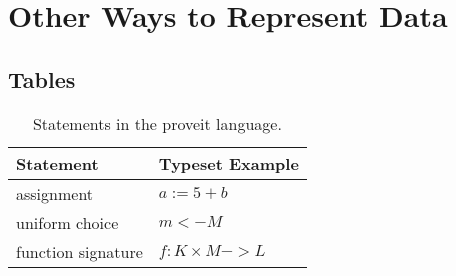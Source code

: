 \documentclass[12pt]{article}
\newcommand\peatykk[1]{
  \clearpage
  \section{#1}}
\begin{document}
\begin{comment}
\begin{figure} [htbp]
\begin{tabular}{c c}
%
\begin{minipage}{0.45\textwidth}
\texttt{[image: LCA\_2\_solutions]}
\end{minipage}
%
&
\begin{minipage}{0.55\textwidth}
\centering
\begin{tabular}{ l | l |}
  Node & Decendants \\ \hline
  1 & 2, 3, 4 \\ \hline
  2 & 3, 4 \\ \hline
  3 & \\ \hline
  4 & \\ \hline
  5 & 3, 4, 6, 7 \\ \hline
  6 & 4 \\ \hline
  7 & 3 \\  \hline
  8 & 3, 4, 5, 6, 7\\ \hline
  9 & 3, 4, 5, 6, 7\\ \hline
\end{tabular}
\end{minipage}
\end{tabular}
%
\caption{Example how to put two figures parallel to each other.}
\label{fig:LCA_2_solutions}
\end{figure}


Example: A screenshot of \proveit can be seen on Figure~\ref{fig:proveit_screenshot}. The user first enters the pseudocode of the initial game in panel B. \proveit also keeps track of all the previous games showing the progress on a graph seen in panel A.

There are two figures side by side on Figure~\ref{fig:LCA_2_solutions}.
\end{comment}
  \peatykk{Other Ways to Represent Data}

\subsection{Tables}

\begin{table}[h]
\centering
\caption{Statements in the proveit language.}
\begin{tabular}{| l | l |}
  \hline
  \bf{Statement} & \bf{Typeset Example} \\
  \hline
  assignment & $a := 5 + b$ \\
  \hline
  uniform choice & $m <- M$ \\
  \hline
  function signature & $f : K \times M -> L$\\
  \hline
\end{tabular}
\label{tab:statements}
\end{table}
\end{document}
